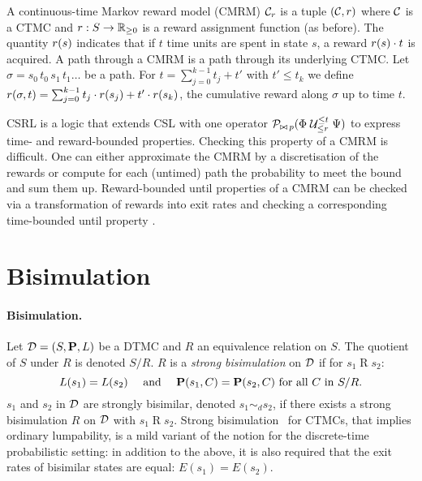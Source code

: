 \documentclass{llncs}
\begin{document}
A continuous-time Markov reward model (CMRM) $\mathcal{C}_r$ is a tuple $(\mathcal{C}, r)$ 
where $\mathcal{C}$ is a CTMC and $r: S \to \mathbb{R}_{\geq 0}$ is a reward assignment
function (as before).
The quantity $r(s)$ indicates that if $t$ time units are spent in state $s$, a reward 
$r(s)\cdot t$ is acquired.
A path through a CMRM is a path through its underlying CTMC.
Let $\sigma = s_0 \, t_0 \, s_1 \, t_1 \ldots$ be a path. 
For $t = \sum_{j{=}0}^{k{-}1} t_j + t'$ with $t' \leq t_k$ we define 
$r(\sigma,t) = \sum_{j{=}0}^{k{-}1} t_j \cdot r(s_j) + t' \cdot r(s_k)$, 
the cumulative reward along $\sigma$ up to time $t$.

	CSRL \cite{BaierHHK_ICALP00} is a logic that extends CSL with one operator
	$\mathcal{P}_{\bowtie\, p}(\Phi \mathrel{\mathrel{\mathcal{U}}^{\leq t}_{\leq r}} \Psi)$
	to express time- and reward-bounded properties.
	Checking this property of a CMRM is difficult.
        One can either approximate the CMRM by a discretisation of the rewards
        or compute for each (untimed) path the probability to meet the bound
        and sum them up.
        Reward-bounded until properties of a CMRM can be checked via a transformation
        of rewards into exit rates and checking a corresponding time-bounded until property
        \cite{BaierHHK_ICALP00}.

\section{Bisimulation}
\label{sec:bisim}

\paragraph{Bisimulation.}
        Let $\mathcal{D} = (S,\mathbf{P},L)$ be a DTMC and $R$ an equivalence relation on $S$.
        The quotient of $S$ under $R$ is denoted $S/R$.
        $R$ is a \emph{strong bisimulation} on $\mathcal{D}$ if for $s_1 \mathrel{R} s_2$: 
        \[
                L(s_1) = L(s_2) \quad \mbox{ and } \quad \mathbf{P}(s_1,C) = 
                \mathbf{P}(s_2,C) \mbox{ for all } C \mbox{ in } S/R.
        \]
        $s_1$ and $s_2$ in $\mathcal{D}$ are strongly bisimilar, denoted $s_1 
        \sim_d s_2$, if there exists a strong bisimulation $R$ on $\mathcal{D}$ with 
        $s_{1} \mathrel{R} s_{2}$.
        Strong bisimulation~\cite{Buchholz_JAP94,Hillston_96} for CTMCs,
        that implies ordinary lumpability,
        is a mild variant of the notion for the discrete-time probabilistic setting:
        in addition to the above, it is also required
        that the exit rates of bisimilar states are equal:
        $E(s_1) = E(s_2)$.
\end{document}
